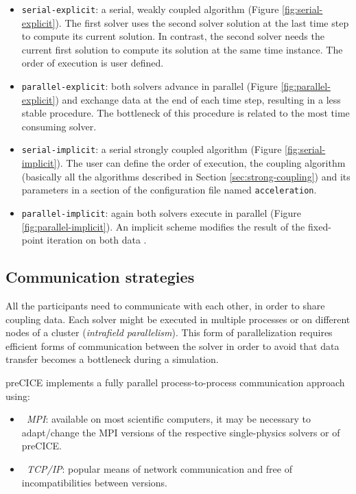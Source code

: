 \begin{itemize}
	\item \texttt{serial-explicit}: a serial, weakly coupled algorithm (Figure \ref{fig:serial-explicit}). The first solver uses the second solver solution at the last time step to compute its current solution. In contrast, the second solver needs the current first solution to compute its solution at the same time instance. The order of execution is user defined.
	\item \texttt{parallel-explicit}: both solvers advance in parallel (Figure \ref{fig:parallel-explicit}) and exchange data at the end of each time step, resulting in a less stable procedure. The bottleneck of this procedure is related to the most time consuming solver.
	\item \texttt{serial-implicit}: a serial strongly coupled algorithm (Figure \ref{fig:serial-implicit}). The user can define the order of execution, the coupling algorithm (basically all the algorithms described in Section \ref{sec:strong-coupling}) and its parameters in a section of the configuration file named \texttt{acceleration}.
	\item \texttt{parallel-implicit}: again both solvers execute in parallel (Figure \ref{fig:parallel-implicit}). An implicit scheme modifies the result of the fixed-point iteration on both data \cite{mehl2016parallel}. 
\end{itemize}



\subsection{Communication strategies}
\label{sec:pc-comm}

All the participants need to communicate with each other, in order to share coupling data.
Each solver might be executed in multiple processes or on different nodes of a cluster (\textit{intrafield parallelism}).
This form of parallelization requires efficient forms of communication between the solver in order to avoid that data transfer becomes a bottleneck during a simulation.

preCICE implements a fully parallel process-to-process communication approach \cite{Shukaev2015} using:

\begin{itemize}
	\item \textit{~\ac{MPI}}: available on 	most scientific computers, it may be necessary to adapt/change the MPI versions of the respective single-physics solvers or of preCICE.
	\item \textit{~\ac{TCP/IP}}: popular means of network communication and free of incompatibilities between versions.
\end{itemize}

